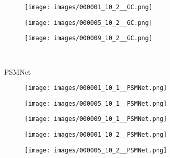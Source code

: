 \begin{figure*}[htpb]
\begin{center}
\begin{minipage}[c]{0.985\textwidth}
\begin{subfigure}[c]{0.33\linewidth}
				\texttt{[image: images/000001\_10\_2\_\_GC.png]}
			\end{subfigure}
			\hspace{-0.5\baselineskip}
			\hfill
			\begin{subfigure}[c]{0.33\linewidth}
				\texttt{[image: images/000005\_10\_2\_\_GC.png]}
			\end{subfigure}
			\hspace{-0.5\baselineskip}
			\hfill
			\begin{subfigure}[c]{0.33\linewidth}
				\texttt{[image: images/000009\_10\_2\_\_GC.png]}
			\end{subfigure}
		\end{minipage}
		\\
\begin{minipage}[c]{0.01\textwidth}
			\begin{turn}{90}\footnotesize{PSMNet \cite{chang2018pyramid}}\end{turn}			
		\end{minipage}
		\begin{minipage}[c]{0.985\textwidth}
			\begin{subfigure}[c]{0.33\linewidth}
				\texttt{[image: images/000001\_10\_1\_\_PSMNet.png]}
			\end{subfigure}
			\hspace{-0.5\baselineskip}
			\hfill
			\begin{subfigure}[c]{0.33\linewidth}
				\texttt{[image: images/000005\_10\_1\_\_PSMNet.png]}
			\end{subfigure}
			\hspace{-0.5\baselineskip}
			\hfill
			\begin{subfigure}[c]{0.33\linewidth}
				\texttt{[image: images/000009\_10\_1\_\_PSMNet.png]}
			\end{subfigure}
			\begin{subfigure}[c]{0.33\linewidth}
				\texttt{[image: images/000001\_10\_2\_\_PSMNet.png]}
			\end{subfigure}
			\hspace{-0.5\baselineskip}
			\hfill
			\begin{subfigure}[c]{0.33\linewidth}
				\texttt{[image: images/000005\_10\_2\_\_PSMNet.png]}
			\end{subfigure}
			\hspace{-0.5\baselineskip}
			\hfill
			\begin{subfigure}[c]{0.33\linewidth}

\end{subfigure}
\end{minipage}
\end{center}
\end{figure*}
